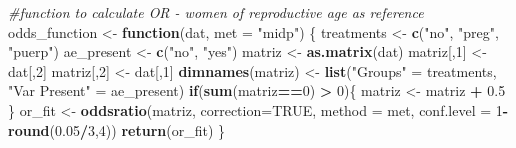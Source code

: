 \documentclass[
]{article}
\newenvironment{Shaded}{\begin{snugshade}}{\end{snugshade}}
\newcommand{\CommentTok}[1]{\textcolor[rgb]{0.56,0.35,0.01}{\textit{#1}}}
\newcommand{\ControlFlowTok}[1]{\textcolor[rgb]{0.13,0.29,0.53}{\textbf{#1}}}
\newcommand{\DataTypeTok}[1]{\textcolor[rgb]{0.13,0.29,0.53}{#1}}
\newcommand{\DecValTok}[1]{\textcolor[rgb]{0.00,0.00,0.81}{#1}}
\newcommand{\FloatTok}[1]{\textcolor[rgb]{0.00,0.00,0.81}{#1}}
\newcommand{\KeywordTok}[1]{\textcolor[rgb]{0.13,0.29,0.53}{\textbf{#1}}}
\newcommand{\NormalTok}[1]{#1}
\newcommand{\OperatorTok}[1]{\textcolor[rgb]{0.81,0.36,0.00}{\textbf{#1}}}
\newcommand{\OtherTok}[1]{\textcolor[rgb]{0.56,0.35,0.01}{#1}}
\newcommand{\StringTok}[1]{\textcolor[rgb]{0.31,0.60,0.02}{#1}}
\begin{document}
\begin{Shaded}
\begin{Highlighting}[]
\CommentTok{#function to calculate OR - women of reproductive age as reference}
\NormalTok{odds_function <-}\StringTok{ }\ControlFlowTok{function}\NormalTok{(dat, }\DataTypeTok{met =} \StringTok{"midp"}\NormalTok{) \{}
\NormalTok{  treatments <-}\StringTok{ }\KeywordTok{c}\NormalTok{(}\StringTok{"no"}\NormalTok{, }\StringTok{"preg"}\NormalTok{, }\StringTok{"puerp"}\NormalTok{)}
\NormalTok{  ae_present <-}\StringTok{ }\KeywordTok{c}\NormalTok{(}\StringTok{"no"}\NormalTok{, }\StringTok{"yes"}\NormalTok{)}
\NormalTok{  matriz <-}\StringTok{ }\KeywordTok{as.matrix}\NormalTok{(dat)}
\NormalTok{  matriz[,}\DecValTok{1}\NormalTok{] <-}\StringTok{ }\NormalTok{dat[,}\DecValTok{2}\NormalTok{]}
\NormalTok{  matriz[,}\DecValTok{2}\NormalTok{] <-}\StringTok{ }\NormalTok{dat[,}\DecValTok{1}\NormalTok{]}
  \KeywordTok{dimnames}\NormalTok{(matriz) <-}\StringTok{ }\KeywordTok{list}\NormalTok{(}\StringTok{"Groups"}\NormalTok{ =}\StringTok{ }\NormalTok{treatments, }
                           \StringTok{"Var Present"}\NormalTok{ =}\StringTok{ }\NormalTok{ae_present)}
  \ControlFlowTok{if}\NormalTok{(}\KeywordTok{sum}\NormalTok{(matriz}\OperatorTok{==}\DecValTok{0}\NormalTok{) }\OperatorTok{>}\StringTok{ }\DecValTok{0}\NormalTok{)\{}
\NormalTok{    matriz <-}\StringTok{ }\NormalTok{matriz }\OperatorTok{+}\StringTok{ }\FloatTok{0.5}
\NormalTok{  \}}
\NormalTok{  or_fit <-}\StringTok{ }\KeywordTok{oddsratio}\NormalTok{(matriz, }\DataTypeTok{correction=}\OtherTok{TRUE}\NormalTok{, }\DataTypeTok{method =}\NormalTok{ met, }\DataTypeTok{conf.level =} \DecValTok{1}\OperatorTok{-}\KeywordTok{round}\NormalTok{(}\FloatTok{0.05}\OperatorTok{/}\DecValTok{3}\NormalTok{,}\DecValTok{4}\NormalTok{))}
  \KeywordTok{return}\NormalTok{(or_fit)}
\NormalTok{\}}


\end{Highlighting}
\end{Shaded}
\end{document}
